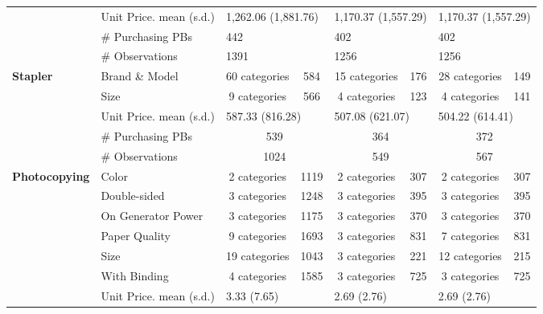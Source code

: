 \begin{longtable}{llccccccccc}
 \cmidrule{2-11} 
 & Unit Price. mean (s.d.) & \multicolumn{3}{l}{1,262.06 (1,881.76)} & \multicolumn{3}{l}{1,170.37 (1,557.29)} & \multicolumn{3}{l}{1,170.37 (1,557.29)} \\* 
 & \# Purchasing PBs & \multicolumn{3}{l}{442} & \multicolumn{3}{l}{402} & \multicolumn{3}{l}{402} \\* 
 & \# Observations & \multicolumn{3}{l}{1391} & \multicolumn{3}{l}{1256} & \multicolumn{3}{l}{1256} \\* 
 \midrule 
 \multirow{5}{*}{\textbf{Stapler}} & Brand \& Model & \multicolumn{2}{c}{60 categories} & 584 & \multicolumn{2}{c}{15 categories} & 176 & \multicolumn{2}{c}{28 categories} & 149 \\* 
 & Size & \multicolumn{2}{c}{9 categories} & 566 & \multicolumn{2}{c}{4 categories} & 123 & \multicolumn{2}{c}{4 categories} & 141 \\* 
 \cmidrule{2-11} 
 & Unit Price. mean (s.d.) & \multicolumn{3}{l}{587.33 (816.28)} & \multicolumn{3}{l}{507.08 (621.07)} & \multicolumn{3}{l}{504.22 (614.41)} \\* 
 & \# Purchasing PBs & \multicolumn{3}{c}{539} & \multicolumn{3}{c}{364}  & \multicolumn{3}{c}{372} \\* 
 & \# Observations & \multicolumn{3}{c}{1024} & \multicolumn{3}{c}{549} & \multicolumn{3}{c}{567} \\* 
 \midrule 
 \multirow{9}{*}{\textbf{Photocopying}} & Color & \multicolumn{2}{c}{2 categories} & 1119 & \multicolumn{2}{c}{2 categories} & 307 & \multicolumn{2}{c}{2 categories} & 307 \\* 
 & Double-sided & \multicolumn{2}{c}{3 categories} & 1248 & \multicolumn{2}{c}{3 categories} & 395 & \multicolumn{2}{c}{3 categories} & 395 \\* 
 & On Generator Power & \multicolumn{2}{c}{3 categories} & 1175 & \multicolumn{2}{c}{3 categories} & 370 & \multicolumn{2}{c}{3 categories} & 370 \\* 
 & Paper Quality & \multicolumn{2}{c}{9 categories} & 1693 & \multicolumn{2}{c}{3 categories} & 831 & \multicolumn{2}{c}{7 categories} & 831 \\* 
 & Size & \multicolumn{2}{c}{19 categories} & 1043 & \multicolumn{2}{c}{3 categories} & 221 & \multicolumn{2}{c}{12 categories} & 215 \\* 
 & With Binding & \multicolumn{2}{c}{4 categories} & 1585 & \multicolumn{2}{c}{3 categories} & 725 & \multicolumn{2}{c}{3 categories} & 725 \\* 
 \cmidrule{2-11} 
 & Unit Price. mean (s.d.) & \multicolumn{3}{l}{3.33 (7.65)} & \multicolumn{3}{l}{2.69 (2.76)} & \multicolumn{3}{l}{2.69 (2.76)} \\* 

\end{longtable}
